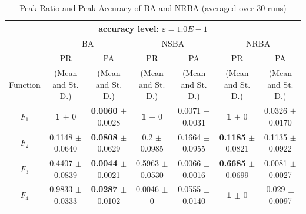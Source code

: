 \documentclass[conference]{IEEEtran}
\begin{document}
\begin{table}[h]
\caption{Peak Ratio and Peak Accuracy of BA and NRBA (averaged over 30 runs)}
\begin{center}
\begin{tabular}{c|c|c|c|c|c|c}
\multicolumn{7}{c}{accuracy level: $\varepsilon = 1.0E-1$} \\
\hline
\multicolumn{1}{c|}{} & \multicolumn{2}{c|}{BA} & \multicolumn{2}{c|}{NSBA} & \multicolumn{2}{c}{NRBA} \\
\hline
 & PR & PA & PR & PA & PR & PA \\

Function & (Mean and St. D.) & (Mean and St. D.) & (Mean and St. D.) & (Mean and St. D.) & (Mean and St. D.) & (Mean and St. D.) \\
\hline
$F_1 $ & {\bf 1} $\pm$ 0 & {\bf 0.0060} $\pm$ 0.0028 & {\bf 1} $\pm$ 0 & 0.0071 $\pm$ 0.0031 & {\bf 1} $\pm$ 0 & 0.0326 $\pm$ 0.0170  \\
\hline
$F_2 $ & 0.1148 $\pm$ 0.0640 & {\bf 0.0808} $\pm$ 0.0629 & 0.2 $\pm$ 0.0985 & 0.1664 $\pm$ 0.0955 & {\bf 0.1185} $\pm$ 0.0821 & 0.1135 $\pm$ 0.0922 \\
\hline
$F_3 $ &  0.4407 $\pm$ 0.0839 & {\bf 0.0044} $\pm$ 0.0021 & 0.5963 $\pm$ 0.0530 & 0.0066 $\pm$ 0.0016 & {\bf 0.6685} $\pm$ 0.0699 & 0.0081 $\pm$ 0.0027\\
\hline
$F_4 $ & 0.9833 $\pm$ 0.0333 & {\bf 0.0287} $\pm$ 0.0102 & 0.0046 $\pm$ 0 & 0.0555 $\pm$ 0.0140 & {\bf 1} $\pm$ 0 & 0.029 $\pm$ 0.0097 \\
\hline
\end{tabular}
\label{tab3}
\end{center}
\end{table}
\end{document}
